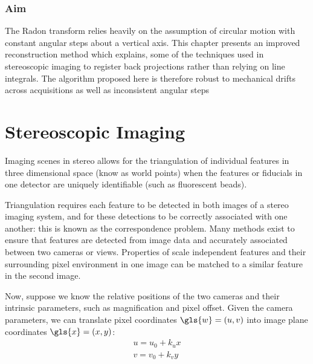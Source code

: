 \subsubsection{Aim}

The \gls{Radon transform} relies heavily on the assumption of circular motion with constant angular steps about a vertical axis.
This chapter presents an improved reconstruction method which explains, some of the techniques used in stereoscopic imaging to register back projections rather than relying on line integrals.
The algorithm proposed here is therefore robust to mechanical drifts across acquisitions as well as inconsistent angular steps

\section{Stereoscopic Imaging}





Imaging scenes in stereo allows for the triangulation of individual features in three dimensional space (know as \gls{world point}s) when the features or fiducials in one detector are uniquely identifiable (such as fluorescent beads).

Triangulation requires each feature
to be detected in both images of a stereo imaging system, and for these detections to be correctly associated with one another:
this is known as the correspondence problem.
Many methods exist to ensure that features are %
detected from image data and accurately associated
between two cameras or views. %
Properties of scale independent features and their surrounding pixel environment in one image can be matched to a similar feature in the second image.

Now, suppose we know the relative positions of the two cameras and their intrinsic parameters, such as magnification and pixel offset.
Given the camera parameters, we can translate pixel coordinates \(\gls{w} = (u, v)\) into \gls{image plane} coordinates \(\gls{x}=(x, y)\):
\begin{align}
    u = u_0 + k_u x \\
    v = v_0 + k_v y
\end{align}

